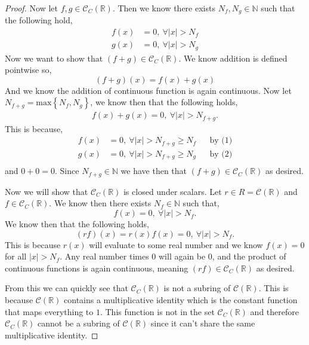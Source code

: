 \documentclass[11pt]{article}
\newcommand{\rr}{\mathbb R}   %
\newcommand{\nn}{\mathbb N}   %
\newcommand{\abs}[1]{\left\lvert#1\right\rvert} %
\newcommand{\set}[1]{\left\{#1\right\}} %
\renewcommand{\geq}{\geqslant}
\begin{document}
\begin{itemize}
\begin{proof}
        Now let $f,g \in \mathcal{C}_C(\rr)$. Then we know there exists $N_f, N_g \in \nn$ such that the following hold,
        \begin{align}
            f(x) &= 0, \ \forall \abs{x} > N_f \\
            g(x) &= 0, \ \forall \abs{x} > N_g
        \end{align}
        Now we want to show that $(f + g) \in \mathcal{C}_C(\rr)$. We know addition is defined pointwise so,
        \[(f+g)(x) = f(x) + g(x)\]
        And we know the addition of continuous function is again continuous. Now let $N_{f+g} = \text{max}\set{N_f, N_g}$, we know then that the following holds,
        \begin{align}
            f(x) + g(x) = 0,\ \forall \abs{x} > N_{f+g}.
        \end{align}
        This is because,
        \begin{align*}
            f(x) &= 0, \ \forall \abs{x} > N_{f+g} \geq N_f && \text{by (1)} \\
            g(x) &= 0, \ \forall \abs{x} > N_{f+g} \geq N_g && \text{by (2)}\\
        \end{align*}
        and $0 + 0 = 0$. Since $N_{f+g} \in \nn$ we have then that $(f+g) \in \mathcal{C}_C(\rr)$ as desired.

        Now we will show that $\mathcal{C}_C(\rr)$ is closed under scalars. Let $r \in R = \mathcal{C}(\rr)$ and $f \in \mathcal{C}_C(\rr)$. We know then there exists $N_f \in \nn$ such that,
        \[f(x) = 0, \ \forall \abs{x} > N_f.\]
        We know then that the following holds,
        \[(rf)(x) = r(x)f(x) = 0, \ \forall \abs{x} > N_f.\]
        This is because $r(x)$ will evaluate to some real number and we know $f(x) = 0$ for all $\abs{x} > N_f$. Any real number times $0$ will again be $0$, and the product of continuous functions is again continuous, meaning $(rf) \in \mathcal{C}_C(\rr)$ as desired.

        From this we can quickly see that $\mathcal{C}_C(\rr)$ is not a subring of $\mathcal{C}(\rr)$. This is because $\mathcal{C}(\rr)$ contains a multiplicative identity which is the constant function that maps everything to $1$. This function is not in the set $\mathcal{C}_C(\rr)$ and therefore $\mathcal{C}_C(\rr)$ cannot be a subring of $\mathcal{C}(\rr)$ since it can't share the same multiplicative identity. 
        
    \end{proof}


\end{itemize}
\end{document}
